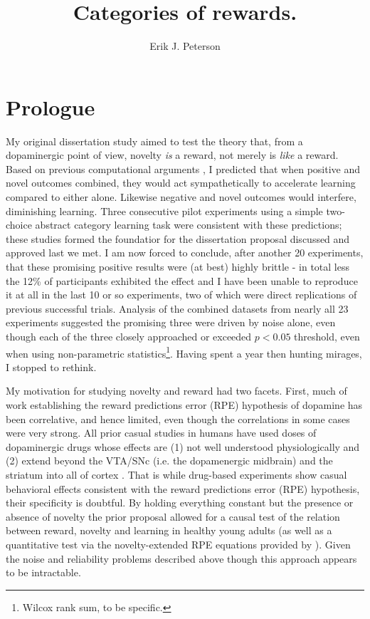 \documentclass[doc,12pt]{apa}        %
\title{Categories of rewards.}
\author{Erik J. Peterson} \affiliation{Dept. of Psychology \\ Colorado State University \\ Fort Collins, CO}
\begin{document}
 
\maketitle

\section{Prologue} %
\label{sec:prologue}
My original dissertation study aimed to test the theory that, from a dopaminergic point of view, novelty \emph{is} a reward, not merely is \emph{like} a reward. Based on previous computational arguments \cite{Kakade:2002p6414}, I predicted that when positive and novel outcomes combined, they would act sympathetically to accelerate learning compared to either alone.  Likewise negative and novel outcomes would interfere, diminishing learning. Three consecutive pilot experiments using a simple two-choice abstract category learning task were consistent with these predictions; these studies formed the foundatior for the dissertation proposal discussed and approved last we met.  I am now forced to conclude, after another 20 experiments, that these promising positive results were (at best) highly brittle - in total less the 12\% of participants exhibited the effect and I have been unable to reproduce it at all in the last 10 or so experiments, two of which were direct replications of previous successful trials.  Analysis of the combined datasets from nearly all 23 experiments suggested the promising three were driven by noise alone, even though each of the three closely approached or exceeded $p < 0.05$ threshold, even when using non-parametric statistics\footnote{Wilcox rank sum, to be specific.}.  Having spent a year then hunting mirages, I stopped to rethink. 

My motivation for studying novelty and reward had two facets.  First, much of work establishing the reward predictions error (RPE) hypothesis of dopamine has been correlative, and hence limited, even though the correlations in some cases were very strong.  All prior casual studies in humans have used doses of dopaminergic drugs whose effects are (1) not well understood physiologically and (2) extend beyond the VTA/SNc (i.e. the dopamenergic midbrain) and the striatum into all of cortex \cite{Menon:2007p6529,Pizzagalli:2008p6521,Schonberg:2009p6669}.  That is while drug-based experiments show casual behavioral effects consistent with the reward predictions error (RPE) hypothesis, their specificity %
is doubtful.  By holding everything constant but the presence or absence of novelty the prior proposal allowed for a causal test of the relation between reward, novelty and learning in healthy young adults (as well as a quantitative test via the novelty-extended RPE equations provided by ).  Given the noise and reliability problems described above though this approach appears to be intractable.  
\end{document}
